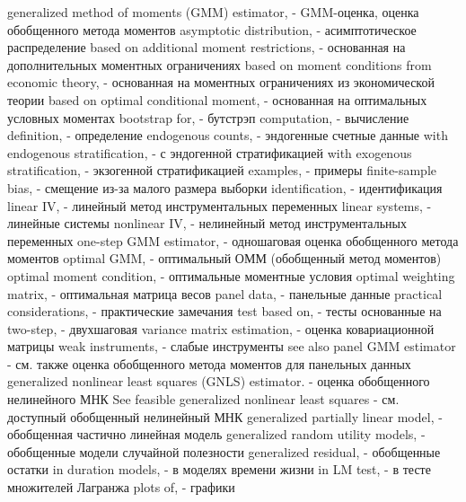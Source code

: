 generalized method of moments (GMM) estimator, - GMM-оценка, оценка обобщенного метода моментов
asymptotic distribution, - асимптотическое распределение
based on additional moment restrictions, - основанная на дополнительных моментных ограничениях
based on moment conditions from economic theory, - основанная на моментных ограничениях из экономической теории
based on optimal conditional moment, - основанная на оптимальных условных моментах
bootstrap for, - бутстрэп
computation, - вычисление
definition, - определение
endogenous counts, - эндогенные счетные данные
with endogenous stratification, - с эндогенной стратификацией
with exogenous stratification, - экзогенной стратификацией
examples, - примеры
finite-sample bias, - смещение из-за малого размера выборки
identification, - идентификация
linear IV, - линейный метод инструментальных переменных
linear systems, - линейные системы
nonlinear IV, - нелинейный метод инструментальных переменных
one-step GMM estimator, - одношаговая оценка обобщенного метода моментов
optimal GMM, - оптимальный ОММ (обобщенный метод моментов)
optimal moment condition, - оптимальные моментные условия
optimal weighting matrix, - оптимальная матрица весов
panel data, - панельные данные
practical considerations, - практические замечания
test based on, - тесты основанные на
two-step, - двухшаговая
variance matrix estimation, - оценка ковариационной матрицы
weak instruments, - слабые инструменты
see also panel GMM estimator - см. также оценка обобщенного метода моментов для панельных данных
generalized nonlinear least squares (GNLS) estimator. - оценка обобщенного нелинейного МНК
See feasible generalized nonlinear least squares - см. доступный обобщенный нелинейный МНК
generalized partially linear model, - обобщенная частично линейная модель
generalized random utility models, - обобщенные модели случайной полезности
generalized residual, - обобщенные остатки
in duration models, - в моделях времени жизни
in LM test, - в тесте множителей Лагранжа
plots of, - графики

